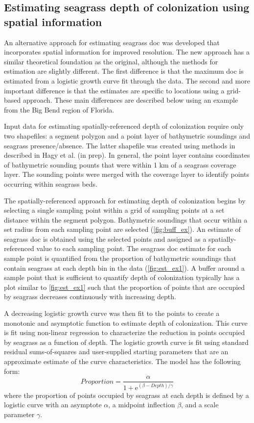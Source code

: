 \documentclass[letterpaper,12pt]{article}\usepackage[]{graphicx}\usepackage[]{color}
\begin{document}
\subsection{Estimating seagrass depth of colonization using spatial information}

An alternative approach for estimating seagrass \ac{doc} was developed that incorporates spatial information for improved resolution.  The new approach has a similar theoretical foundation as the original, although the methods for estimation are slightly different.  The first difference is that the maximum \ac{doc} is estimated from a logistic growth curve fit through the data.  The second and more important difference is that the estimates are specific to locations using a grid-based approach.  These main differences are described below using an example from the Big Bend region of Florida.                                  

Input data for estimating spatially-referenced depth of colonization require only two shapefiles: a segment polygon and a point layer of bathymetric soundings and seagrass presence/absence.  The latter shapefile was created using methods in described in Hagy et al. (in prep).  In general, the point layer contains coordinates of bathymetric sounding pounts that were within 1 km of a seagrass coverage layer.  The sounding points were merged with the coverage layer to identify points occurring within seagrass beds.  

The spatially-referenced approach for estimating depth of colonization begins by selecting a single sampling point within a grid of sampling points at a set distance within the segment polygon.  Bathymetric soundings that occur within a set radius from each sampling point are selected (\cref{fig:buff_ex}).  An estimate of seagrass \ac{doc} is obtained using the selected points and assigned as a spatially-referenced value to each sampling point.  The seagrass \ac{doc} estimate for each sample point is quantified from the proportion of bathymetric soundings that contain seagrass at each depth bin in the data (\cref{fig:est_ex1}).  A buffer around a sample point that is sufficient to quantify depth of colonization typically has a plot similar to \cref{fig:est_ex1} such that the proportion of points that are occupied by seagrass decreases continuously with increasing depth.  

A decreasing logistic growth curve was then fit to the points to create a monotonic and asymptotic function to estimate depth of colonization.  This curve is fit using non-linear regression to characterize the reduction in points occupied by seagrass as a function of depth.  The logistic growth curve is fit using standard residual sums-of-squares and user-supplied starting parameters that are an approximate estimate of the curve characteristics.  The model has the following form:
\begin{equation}
 Proportion = \frac{\alpha}{1 + \mathrm{e}^{{\left(\beta - Depth\right)/\gamma}}}
\end{equation}
where the proportion of points occupied by seagrass at each depth is defined by a logistic curve with an asymptote $\alpha$, a midpoint inflection $\beta$, and a scale parameter $\gamma$.    
\end{document}
